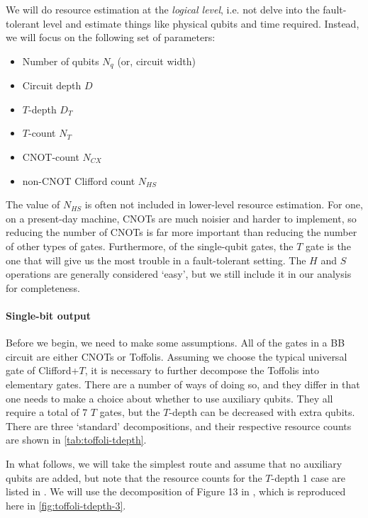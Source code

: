 \documentclass[a4paper,12pt]{article}
\begin{document}
We will do resource estimation at the \emph{logical level}, i.e. not delve into the fault-tolerant level and estimate things like physical qubits and time required. 
Instead, we will focus on the following set of parameters:
\begin{itemize}
 \item Number of qubits $N_q$ (or, circuit width)
 \item Circuit depth $D$
 \item $T$-depth $D_T$
 \item $T$-count $N_T$
 \item CNOT-count $N_{CX}$
 \item non-CNOT Clifford count $N_{HS}$
\end{itemize}
The value of $N_{HS}$ is often not included in lower-level resource estimation. 
For one, on a present-day machine, CNOTs are much noisier and harder to implement, so reducing the number of CNOTs is far more important than reducing the number of other types of gates. 
Furthermore, of the single-qubit gates, the $T$ gate is the one that will give us the most trouble in a fault-tolerant setting. 
The $H$ and $S$ operations are generally considered `easy', but we still include it in our analysis for completeness.

\paragraph{Single-bit output}

Before we begin, we need to make some assumptions. 
All of the gates in a BB circuit are either CNOTs or Toffolis. 
Assuming we choose the typical universal gate of Clifford+$T$, it is necessary to further decompose the Toffolis into elementary gates.
There are a number of ways of doing so, and they differ in that one needs to make a choice about whether to use auxiliary qubits. 
They all require a total of 7 $T$ gates, but the $T$-depth can be decreased with extra qubits. 
There are three `standard' decompositions, and their respective resource counts are shown in \autoref{tab:toffoli-tdepth}. 

In what follows, we will take the simplest route and assume that no auxiliary qubits are added, but note that the resource counts for the $T$-depth 1 case are listed in \cite{DiMatteo2020}. 
We will use the decomposition of Figure 13 in \cite{MITM}, which is reproduced here in \autoref{fig:toffoli-tdepth-3}.
\end{document}
